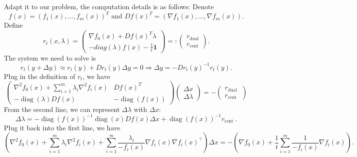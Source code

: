 \documentclass{article}
\begin{document}
Adapt it to our problem, the computation details is as follows: Denote
\begin{equation}
    f(x) = (f_1(x),\dots,f_m(x))^T\text{ and }Df(x)^T = (\nabla f_1(x),\dots,\nabla f_m(x)).
\end{equation}
Define
\begin{equation}
    r_t(x,\lambda) = \begin{pmatrix}
    \nabla f_0(x)+Df(x)^T\lambda\\
    -diag(\lambda)f(x)-\frac{1}{t}\boldsymbol{1}
    \end{pmatrix}=:\begin{pmatrix}
        r_{\text{dual}}\\
        r_{\text{cent}}
    \end{pmatrix}.
\end{equation}
The system we need to solve is
\begin{equation}
    r_t(y+\Delta y) \approx r_t(y)+D r_t(y) \Delta y=0 \Rightarrow \Delta y=-D r_t(y)^{-1} r_t(y).
\end{equation}
Plug in the definition of $r_t$, we have
\begin{equation}
    \left(\begin{array}{cc}
\nabla^2 f_0(x)+\sum_{i=1}^m \lambda_i \nabla^2 f_i(x) & D f(x)^{T} \\
-\operatorname{diag}(\lambda) D f(x) & -\operatorname{diag}(f(x))
\end{array}\right)\left(\begin{array}{c}
\Delta x \\
\Delta \lambda
\end{array}\right)=-\left(\begin{array}{c}
r_{\text {dual }} \\
r_{\text {cent }}
\end{array}\right)
\end{equation}
From the second line, we can represent $\Delta \lambda$ with $\Delta x$:
\begin{equation}
    \Delta \lambda = -\operatorname{diag}(f(x))^{-1} \operatorname{diag}(x) D f(x) \Delta x+\operatorname{diag}(f(x))^{-1} r_{\text {cent }}.
\end{equation}
Plug it back into the first line, we have
\begin{equation}
    \left(\nabla^2 f_0(x)+\sum_{i=1}^m \lambda_i \nabla^2 f_i(x)+\sum_{i=1}^m \frac{\lambda_i}{-f_i(x)} \nabla f_i(x) \nabla f_i(x)^{\top}\right) \Delta x=-\left(\nabla f_0(x)+\frac{1}{t} \sum_{i=1}^m \frac{1}{-f_i(x)} \nabla f_i(x)\right).
\end{equation}
\end{document}
